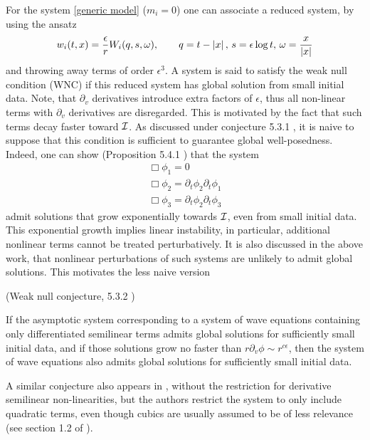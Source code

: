 \documentclass[11pt, oneside]{amsart}
\begin{document}
	For the system \cref{generic model} ($m_i=0$) one can associate a reduced system, by using the ansatz
	\begin{equation*}
		\begin{gathered}
			w_i(t,x)=\frac{\epsilon}{r}W_i(q,s,\omega),\qquad q=t-\left\lvert x\right\rvert,\, s=\epsilon\log t,\, \omega=\frac{x}{\left\lvert x\right\rvert}
		\end{gathered}
	\end{equation*}
	and throwing away terms of order $\epsilon^3$. A system is said to satisfy the weak null condition (WNC) if this reduced system has global solution from small initial data. Note, that $\partial_v$ derivatives introduce extra factors of $\epsilon$, thus all non-linear terms with $\partial_v$ derivatives are disregarded. This is motivated by the fact that such terms decay faster toward $\mathcal{I}$. As discussed under conjecture 5.3.1 \cite{keir_weak_2018}, it is naive to suppose that this condition is sufficient to guarantee global well-posedness. Indeed, one can show (Proposition 5.4.1 \cite{keir_weak_2018}) that the system
	\begin{equation*}
		\begin{gathered}
			\Box\phi_1=0\\
			\Box\phi_2=\partial_t\phi_2\partial_t\phi_1\\
			\Box\phi_3=\partial_t\phi_2\partial_t\phi_3
		\end{gathered}
	\end{equation*} 
	admit solutions that grow exponentially towards $\mathcal{I}$, even from small initial data. This exponential growth implies linear instability, in particular, additional nonlinear terms cannot be treated perturbatively. It is also discussed in the above work, that nonlinear perturbations of such systems are unlikely to admit global solutions. This motivates the less naive version
	\begin{conjecture*}(Weak null conjecture, 5.3.2 \cite{keir_weak_2018})
		
		If the asymptotic system corresponding to a system of wave
		equations containing only differentiated semilinear terms admits global solutions for sufficiently small initial data, and if those solutions grow no faster than $r\partial_v\phi\sim r^{c\epsilon}$, then the system of wave equations also admits global solutions for sufficiently small initial data.
	\end{conjecture*}
	
	A similar conjecture also appears in \cite{deng_global_2018}, without the restriction for derivative semilinear non-linearities, but the authors restrict the system to only include quadratic terms, even though cubics are usually assumed to be of less relevance (see section 1.2 of \cite{keir_weak_2018}).
	
\end{document}

